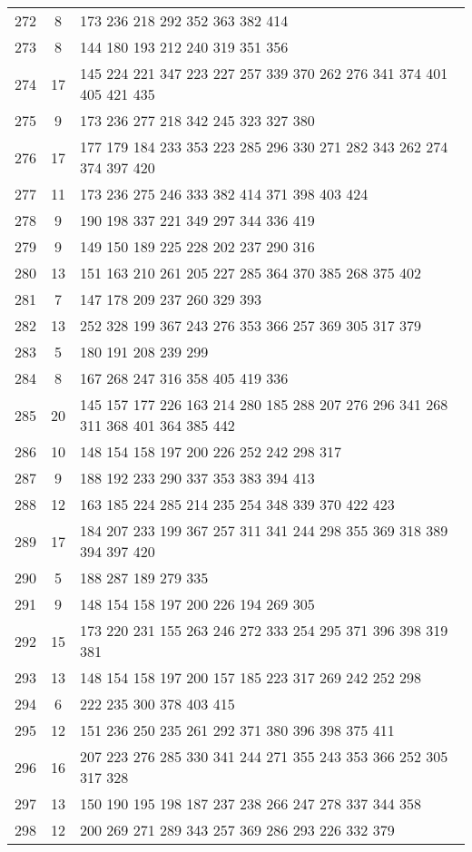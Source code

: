 \documentclass{standalone}
\begin{document}
\begin{tabular}{c c l}
272 & 8 & 173 236 218 292 352 363 382 414 \\
273 & 8 & 144 180 193 212 240 319 351 356 \\
274 & 17 & 145 224 221 347 223 227 257 339 370 262 276 341 374 401 405 421 435 \\
275 & 9 & 173 236 277 218 342 245 323 327 380 \\
276 & 17 & 177 179 184 233 353 223 285 296 330 271 282 343 262 274 374 397 420 \\
277 & 11 & 173 236 275 246 333 382 414 371 398 403 424 \\
278 & 9 & 190 198 337 221 349 297 344 336 419 \\
279 & 9 & 149 150 189 225 228 202 237 290 316 \\
280 & 13 & 151 163 210 261 205 227 285 364 370 385 268 375 402 \\
281 & 7 & 147 178 209 237 260 329 393 \\
282 & 13 & 252 328 199 367 243 276 353 366 257 369 305 317 379 \\
283 & 5 & 180 191 208 239 299 \\
284 & 8 & 167 268 247 316 358 405 419 336 \\
285 & 20 & 145 157 177 226 163 214 280 185 288 207 276 296 341 268 311 368 401 364 385 442 \\
286 & 10 & 148 154 158 197 200 226 252 242 298 317 \\
287 & 9 & 188 192 233 290 337 353 383 394 413 \\
288 & 12 & 163 185 224 285 214 235 254 348 339 370 422 423 \\
289 & 17 & 184 207 233 199 367 257 311 341 244 298 355 369 318 389 394 397 420 \\
290 & 5 & 188 287 189 279 335 \\
291 & 9 & 148 154 158 197 200 226 194 269 305 \\
292 & 15 & 173 220 231 155 263 246 272 333 254 295 371 396 398 319 381 \\
293 & 13 & 148 154 158 197 200 157 185 223 317 269 242 252 298 \\
294 & 6 & 222 235 300 378 403 415 \\
295 & 12 & 151 236 250 235 261 292 371 380 396 398 375 411 \\
296 & 16 & 207 223 276 285 330 341 244 271 355 243 353 366 252 305 317 328 \\
297 & 13 & 150 190 195 198 187 237 238 266 247 278 337 344 358 \\
298 & 12 & 200 269 271 289 343 257 369 286 293 226 332 379 \\

\end{tabular}
\end{document}
